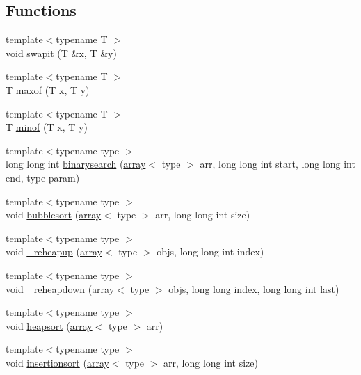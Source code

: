 \subsection*{Functions}
\begin{DoxyCompactItemize}
\item 
{\footnotesize template$<$typename T $>$ }\\void \hyperlink{namespacedsa_adef386c1a6c759a0abe6b51b5059bacf}{swapit} (T \&x, T \&y)
\item 
{\footnotesize template$<$typename T $>$ }\\T \hyperlink{namespacedsa_a679b87e61754a4876290b6c8ee238c9d}{maxof} (T x, T y)
\item 
{\footnotesize template$<$typename T $>$ }\\T \hyperlink{namespacedsa_a54888559342933eb2bbd2ecb677049f2}{minof} (T x, T y)
\item 
{\footnotesize template$<$typename type $>$ }\\long long int \hyperlink{namespacedsa_a57cd558b7dba2595786b4e06e4e3110a}{binarysearch} (\hyperlink{classdsa_1_1array}{array}$<$ type $>$ arr, long long int start, long long int end, type param)
\item 
{\footnotesize template$<$typename type $>$ }\\void \hyperlink{namespacedsa_a191cb92b47c09b5d83061967971711a3}{bubblesort} (\hyperlink{classdsa_1_1array}{array}$<$ type $>$ arr, long long int size)
\item 
{\footnotesize template$<$typename type $>$ }\\void \hyperlink{namespacedsa_a045a32478e167a6c809a48dce9e67e2d}{\+\_\+reheapup} (\hyperlink{classdsa_1_1array}{array}$<$ type $>$ objs, long long int index)
\item 
{\footnotesize template$<$typename type $>$ }\\void \hyperlink{namespacedsa_ac4e7656bc9910c452d4d1fa65a4f7a1e}{\+\_\+reheapdown} (\hyperlink{classdsa_1_1array}{array}$<$ type $>$ objs, long long index, long long int last)
\item 
{\footnotesize template$<$typename type $>$ }\\void \hyperlink{namespacedsa_a92ab85f4ebb648df70b7c2db6a0405df}{heapsort} (\hyperlink{classdsa_1_1array}{array}$<$ type $>$ arr)
\item 
{\footnotesize template$<$typename type $>$ }\\void \hyperlink{namespacedsa_a41ed7142d1ce6e29e12cdf4456314d53}{insertionsort} (\hyperlink{classdsa_1_1array}{array}$<$ type $>$ arr, long long int size)

\end{DoxyCompactItemize}
